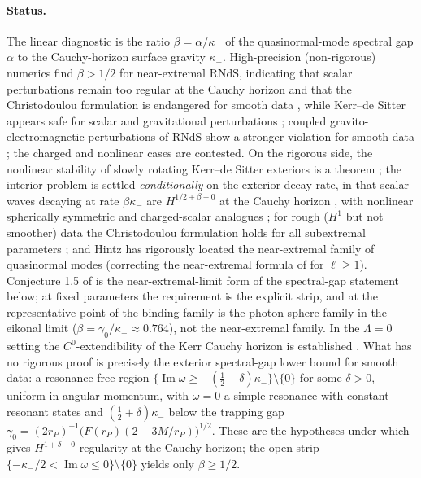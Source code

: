\documentclass[11pt,letterpaper]{article}
\begin{document}
\paragraph{Status.} The linear diagnostic is the ratio $\beta=\alpha/\kappa_-$ of the quasinormal-mode spectral gap $\alpha$ to the Cauchy-horizon surface gravity $\kappa_-$. High-precision (non-rigorous) numerics find $\beta>1/2$ for near-extremal RNdS, indicating that scalar perturbations remain too regular at the Cauchy horizon and that the Christodoulou formulation is endangered for smooth data \cite{cardoso2018}, while Kerr--de Sitter appears safe for scalar and gravitational perturbations \cite{dias2018}; coupled gravito-electromagnetic perturbations of RNdS show a stronger violation for smooth data \cite{drs2018}; the charged and nonlinear cases are contested. On the rigorous side, the nonlinear stability of slowly rotating Kerr--de Sitter exteriors is a theorem \cite{hintzvasy2018}; the interior problem is settled \emph{conditionally} on the exterior decay rate, in that scalar waves decaying at rate $\beta\kappa_-$ are $H^{1/2+\beta-0}$ at the Cauchy horizon \cite{hintzvasy2017}, with nonlinear spherically symmetric and charged-scalar analogues \cite{cgns2018,rossetti2025}; for rough ($H^1$ but not smoother) data the Christodoulou formulation holds for all subextremal parameters \cite{dsr2018}; and Hintz \cite{hintz2025} has rigorously located the near-extremal family of quasinormal modes (correcting the near-extremal formula of \cite{cardoso2018} for $\ell\ge1$). Conjecture 1.5 of \cite{hintz2025} is the near-extremal-limit form of the spectral-gap statement below; at fixed parameters the requirement is the explicit strip, and at the representative point of \cite[Table~I]{cardoso2018} the binding family is the photon-sphere family in the eikonal limit ($\beta=\gamma_0/\kappa_-\approx0.764$), not the near-extremal family. In the $\Lambda=0$ setting the $C^0$-extendibility of the Kerr Cauchy horizon is established \cite{dafermosluk2017}. What has no rigorous proof is precisely the exterior spectral-gap lower bound for smooth data: a resonance-free region $\{\operatorname{Im}\omega\ge-(\tfrac12+\delta)\kappa_-\}\setminus\{0\}$ for some $\delta>0$, uniform in angular momentum, with $\omega=0$ a simple resonance with constant resonant states and $(\tfrac12+\delta)\kappa_-$ below the trapping gap $\gamma_0=(2r_P)^{-1}\bigl(F(r_P)(2-3M/r_P)\bigr)^{1/2}$. These are the hypotheses under which \cite{hintzvasy2017} gives $H^{1+\delta-0}$ regularity at the Cauchy horizon; the open strip $\{-\kappa_-/2<\operatorname{Im}\omega\le0\}\setminus\{0\}$ yields only $\beta\ge1/2$.
\end{document}
